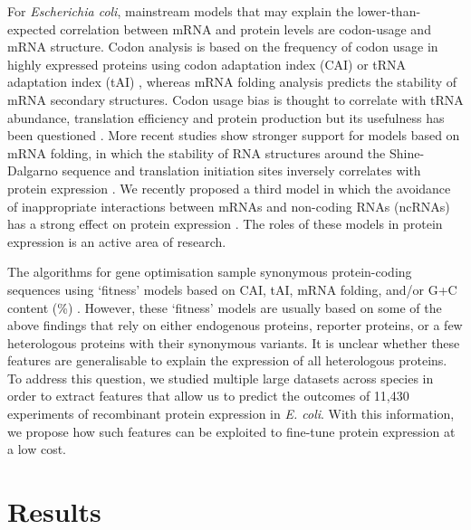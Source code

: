 For \textit{Escherichia coli}, mainstream models that may explain the lower-than-expected correlation between mRNA and protein levels are codon-usage and mRNA structure. Codon analysis is based on the frequency of codon usage in highly expressed proteins using codon adaptation index (CAI) \cite{Sharp1987-ed} or tRNA adaptation index (tAI) \cite{Reis2004-dl,Sabi2014-je}, whereas mRNA folding analysis predicts the stability of mRNA secondary structures. Codon usage bias is thought to correlate with tRNA abundance, translation efficiency and protein production \cite{Sharp1987-ed,Gutman1989-pn,Reis2004-dl,Sabi2014-je,Brule2017-mx,Osterman2020-js,Verma2019-gh} but its usefulness has been questioned \cite{Kudla2009-tl,Plotkin2011-ak,Boel2016-jd,Cambray2018-kn}. More recent studies show stronger support for models based on mRNA folding, in which the stability of RNA structures around the Shine-Dalgarno sequence and translation initiation sites inversely correlates with protein expression \cite{De_Smit1990-xy,Kudla2009-tl,Plotkin2011-ak,Dvir2013-lq,Tuller2015-ts,Cambray2018-kn}. We recently proposed a third model in which the avoidance of inappropriate interactions between mRNAs and non-coding RNAs (ncRNAs) has a strong effect on protein expression \cite{Umu2016-zq}. The roles of these models in protein expression is an active area of research.

The algorithms for gene optimisation sample synonymous protein-coding sequences using ‘fitness’ models based on CAI, tAI, mRNA folding, and/or G+C content (\%) \cite{Villalobos2006-nx,Salis2009-dh,Raab2010-eg,Chung2012-zh,Terai2016-vp}. However, these ‘fitness’ models are usually based on some of the above findings that rely on either endogenous proteins, reporter proteins, or a few heterologous proteins with their synonymous variants. It is unclear whether these features are generalisable to explain the expression of all heterologous proteins. To address this question, we studied multiple large datasets across species in order to extract features that allow us to predict the outcomes of 11,430 experiments of recombinant protein expression in \textit{E. coli}. With this information, we propose how such features can be exploited to fine-tune protein expression at a low cost.

\section{Results}
